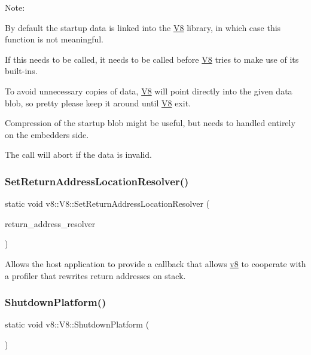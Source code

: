 Note\+:
\begin{DoxyItemize}
\item By default the startup data is linked into the \mbox{\hyperlink{classv8_1_1V8}{V8}} library, in which case this function is not meaningful.
\item If this needs to be called, it needs to be called before \mbox{\hyperlink{classv8_1_1V8}{V8}} tries to make use of its built-\/ins.
\item To avoid unnecessary copies of data, \mbox{\hyperlink{classv8_1_1V8}{V8}} will point directly into the given data blob, so pretty please keep it around until \mbox{\hyperlink{classv8_1_1V8}{V8}} exit.
\item Compression of the startup blob might be useful, but needs to handled entirely on the embedders\textquotesingle{} side.
\item The call will abort if the data is invalid. 
\end{DoxyItemize}\mbox{\label{classv8_1_1V8_a7a9e8a96dcb3c3d306c0061b0a8e39c8}} 
\subsubsection{\texorpdfstring{Set\+Return\+Address\+Location\+Resolver()}{SetReturnAddressLocationResolver()}}
{\footnotesize\ttfamily static void v8\+::\+V8\+::\+Set\+Return\+Address\+Location\+Resolver (\begin{DoxyParamCaption}\item[{\mbox{\hyperlink{namespacev8_a8ce54c75241be41ff6a25e9944eefd2a}{Return\+Address\+Location\+Resolver}}}]{return\+\_\+address\+\_\+resolver }\end{DoxyParamCaption})\hspace{0.3cm}{\ttfamily [static]}}

Allows the host application to provide a callback that allows \mbox{\hyperlink{namespacev8}{v8}} to cooperate with a profiler that rewrites return addresses on stack. \mbox{\label{classv8_1_1V8_a228fad83cc2fe17f10cea1a6fb6669c7}} 
\subsubsection{\texorpdfstring{Shutdown\+Platform()}{ShutdownPlatform()}}
{\footnotesize\ttfamily static void v8\+::\+V8\+::\+Shutdown\+Platform (\begin{DoxyParamCaption}{ }\end{DoxyParamCaption})\hspace{0.3cm}{\ttfamily [static]}}

